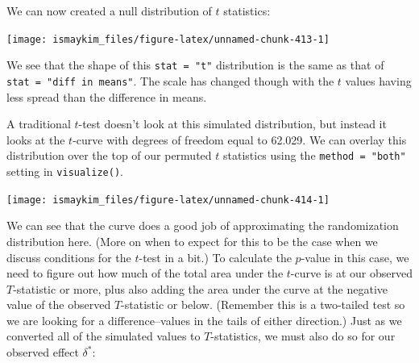 \documentclass[12pt,]{krantz}
\makeatletter
\newenvironment{Shaded}{\begin{snugshade}}{\end{snugshade}}
\newcommand{\KeywordTok}[1]{\textcolor[rgb]{0.27,0.27,0.27}{\textbf{#1}}}
\newcommand{\DataTypeTok}[1]{\textcolor[rgb]{0.27,0.27,0.27}{#1}}
\newcommand{\StringTok}[1]{\textcolor[rgb]{0.5,0.5,0.5}{#1}}
\newcommand{\OperatorTok}[1]{\textcolor[rgb]{0.43,0.43,0.43}{\textbf{#1}}}
\newcommand{\NormalTok}[1]{#1}
\newenvironment{kframe}{%
\medskip{}
\setlength{\fboxsep}{.8em}
 \def\at@end@of@kframe{}%
 \ifinner\ifhmode%
  \def\at@end@of@kframe{\end{minipage}}%
  \begin{minipage}{\columnwidth}%
 \fi\fi%
 \def\FrameCommand##1{\hskip\@totalleftmargin \hskip-\fboxsep
 \colorbox{shadecolor}{##1}\hskip-\fboxsep
     \hskip-\linewidth \hskip-\@totalleftmargin \hskip\columnwidth}%
 \MakeFramed {\advance\hsize-\width
   \@totalleftmargin\z@ \linewidth\hsize
   \@setminipage}}%
 {\par\unskip\endMakeFramed%
 \at@end@of@kframe}
\renewenvironment{Shaded}{\begin{kframe}}{\end{kframe}}
\makeatother
\begin{document}
We can now created a null distribution of \(t\) statistics:

\begin{Shaded}
\end{Shaded}

\begin{center}\texttt{[image: ismaykim\_files/figure-latex/unnamed-chunk-413-1]} \end{center}

We see that the shape of this \texttt{stat\ =\ "t"} distribution is the
same as that of \texttt{stat\ =\ "diff\ in\ means"}. The scale has
changed though with the \(t\) values having less spread than the
difference in means.

A traditional \(t\)-test doesn't look at this simulated distribution,
but instead it looks at the \(t\)-curve with degrees of freedom equal to
62.029. We can overlay this distribution over the top of our permuted
\(t\) statistics using the \texttt{method\ =\ "both"} setting in
\texttt{visualize()}.

\begin{Shaded}
\end{Shaded}

\begin{center}\texttt{[image: ismaykim\_files/figure-latex/unnamed-chunk-414-1]} \end{center}

We can see that the curve does a good job of approximating the
randomization distribution here. (More on when to expect for this to be
the case when we discuss conditions for the \(t\)-test in a bit.) To
calculate the \(p\)-value in this case, we need to figure out how much
of the total area under the \(t\)-curve is at our observed
\(T\)-statistic or more, plus also adding the area under the curve at
the negative value of the observed \(T\)-statistic or below. (Remember
this is a two-tailed test so we are looking for a difference--values in
the tails of either direction.) Just as we converted all of the
simulated values to \(T\)-statistics, we must also do so for our
observed effect \(\delta^*\):
\end{document}
